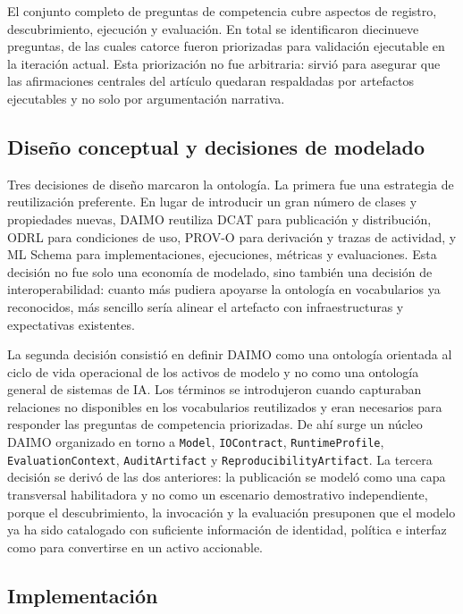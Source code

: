 \documentclass[11pt,a4paper]{article}
\newcommand{\code}[1]{\texttt{#1}}
\begin{document}
El conjunto completo de preguntas de competencia cubre aspectos de registro, descubrimiento, ejecución y evaluación. En total se identificaron diecinueve preguntas, de las cuales catorce fueron priorizadas para validación ejecutable en la iteración actual. Esta priorización no fue arbitraria: sirvió para asegurar que las afirmaciones centrales del artículo quedaran respaldadas por artefactos ejecutables y no solo por argumentación narrativa.

\subsection{Diseño conceptual y decisiones de modelado}

Tres decisiones de diseño marcaron la ontología. La primera fue una estrategia de reutilización preferente. En lugar de introducir un gran número de clases y propiedades nuevas, DAIMO reutiliza DCAT para publicación y distribución, ODRL para condiciones de uso, PROV-O para derivación y trazas de actividad, y ML Schema para implementaciones, ejecuciones, métricas y evaluaciones. Esta decisión no fue solo una economía de modelado, sino también una decisión de interoperabilidad: cuanto más pudiera apoyarse la ontología en vocabularios ya reconocidos, más sencillo sería alinear el artefacto con infraestructuras y expectativas existentes.

La segunda decisión consistió en definir DAIMO como una ontología orientada al ciclo de vida operacional de los activos de modelo y no como una ontología general de sistemas de IA. Los términos se introdujeron cuando capturaban relaciones no disponibles en los vocabularios reutilizados y eran necesarios para responder las preguntas de competencia priorizadas. De ahí surge un núcleo DAIMO organizado en torno a \code{Model}, \code{IOContract}, \code{RuntimeProfile}, \code{EvaluationContext}, \code{AuditArtifact} y \code{ReproducibilityArtifact}. La tercera decisión se derivó de las dos anteriores: la publicación se modeló como una capa transversal habilitadora y no como un escenario demostrativo independiente, porque el descubrimiento, la invocación y la evaluación presuponen que el modelo ya ha sido catalogado con suficiente información de identidad, política e interfaz como para convertirse en un activo accionable.

\subsection{Implementación}
\end{document}
